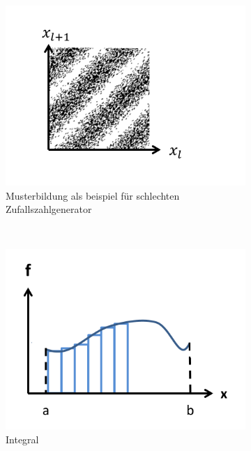 \documentclass[12pt]{article}
\begin{document}
\begin{enumerate}
\begin{figure}[h] 
		\begin{subfigure}[h]{0.5 \textwidth}
		\centering
		\includegraphics[width=\textwidth]{Folie13.png}
		\caption{Musterbildung als beispiel für schlechten Zufallszahlgenerator} 
		\label{fig:Interferenz}
		\centering
	\end{subfigure}
	~
	\begin{subfigure}[h]{0.5\textwidth}
		\centering
		\includegraphics[width=\textwidth]{Folie14.png}
		\caption{Integral} 
		\label{fig:Integral}
		\centering
	\end{subfigure}
	\caption{ }
\end{figure}



\end{enumerate}
\end{document}
